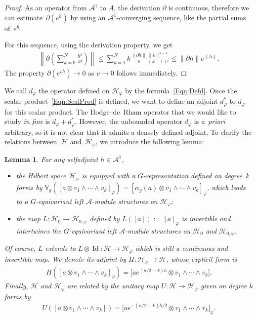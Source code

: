 \documentclass[pdftex]{sigma}
\newtheorem{Lemma}[Theorem]{Lemma}
\newcommand{\Aa}{\mathcal{A}}
\newcommand{\Hh}{\mathscr{H}}
\newcommand{\RepV}{\mathbb{V}}
\DeclareMathOperator{\id}{Id}
\numberwithin{equation}{section}
\begin{document}
\begin{proof}
As an operator from $\Aa^1$ to $A$, the derivation $\partial $ is continuous, therefore we can estimate~$\partial (e^h)$ by using an $\Aa^1$-converging sequence, like the partial sums of~$e^{h}$.

For this sequence, using the derivation property, we get
\begin{gather*}
\left\| \partial \left( \sum_{k=0}^N \frac{h^k}{k !} \right) \right\| \leqslant \sum_{k=1}^N k \frac{\| \partial h \| }{k} \frac{\| h \|^{k-1}}{(k-1)!} \leqslant \| \partial h \| e^{\| h \|}.
\end{gather*}
The property $\partial (e^{v h}) \to 0$ as $v \to 0$ follows immediately.
\end{proof}

We call $d_\varphi$ the operator def\/ined on $\Hh_\varphi$ by the formula~\eqref{Eqn:Defd}. Once the scalar product~\eqref{Eqn:ScalProd} is def\/ined, we want to def\/ine an adjoint $d^*_\varphi$ to $d_\varphi$ for this scalar product. The Hodge--de~Rham operator that we would like to study \textit{in fine} is $d_\varphi + d_\varphi^*$. However, the unbounded operator $d_\varphi$ is \textit{a~priori} arbitrary, so it is not clear that it admits a densely def\/ined adjoint. To clarify the relations between~$\Hh$ and~$\Hh_\varphi$, we introduce the following lemma:
\begin{Lemma}
\label{Lem:EquivRep}
For any selfadjoint $h \in \Aa^1$,
\begin{itemize}\itemsep=0pt
\item
the Hilbert space $\Hh_{\varphi}$ is equipped with a $G$-representation defined on degree~$k$ forms by $\RepV_g( [a \otimes v_1 \wedge \cdots \wedge v_k]_\varphi) = [\alpha_g(a) \otimes v_1 \wedge \cdots \wedge v_k]_\varphi$, which leads to a $G$-equivariant left $\Aa$-module structures on $\Hh_{\varphi}$;
\item
the map $L \colon \Hh_0 \to \Hh_{0,\varphi}$ defined by $L([a]):= [a]_\varphi$ is invertible and intertwines the $G$-equivariant left $\Aa$-module structures on $\Hh_0$ and $\Hh_{0,\varphi}$.
\end{itemize}
Of course, $L$ extends to $L \otimes \id \colon \Hh \to \Hh_\varphi$ which is still a continuous and invertible map. We denote its adjoint by $H \colon \Hh_\varphi \to \Hh$, whose explicit form is
\begin{gather*}
H( [a \otimes v_1 \wedge \cdots \wedge v_k]_\varphi ) =\big [a e^{(n/2-k)h} \otimes v_1 \wedge \cdots \wedge v_k\big].
\end{gather*}
Finally, $\Hh$ and $\Hh_\varphi$ are related by the unitary map $U \colon \Hh \to \Hh_\varphi$ given on degree $k$ forms by
\begin{gather*}
U( [a \otimes v_1 \wedge \cdots \wedge v_k] ) = \big[a e^{-(n/2-k)h/2} \otimes v_1 \wedge \cdots \wedge v_k\big]_\varphi.
\end{gather*}
\end{Lemma}
\end{document}
